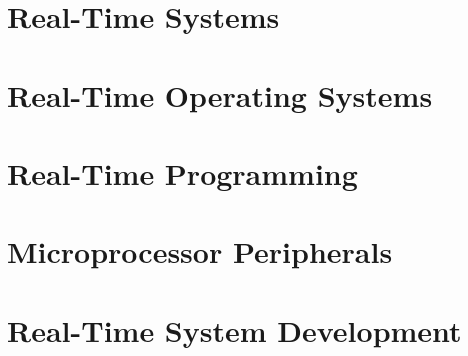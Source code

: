 \chapter{Real-Time Systems}


\chapter{Real-Time Operating Systems}


\chapter{Real-Time Programming}


\chapter{Microprocessor Peripherals}


\chapter{Real-Time System Development}







